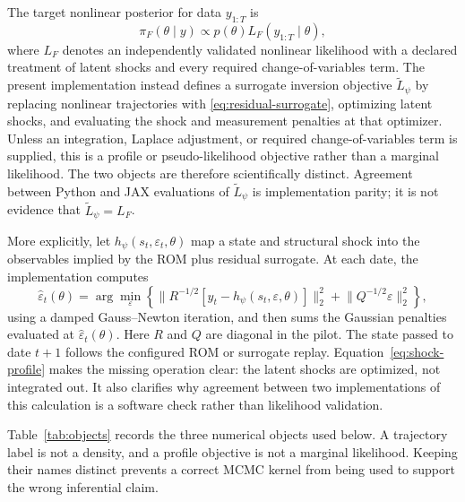 \documentclass[11pt]{article}
\begin{document}
The target nonlinear posterior for data $y_{1:T}$ is
\begin{equation}
  \pi_F(\theta\mid y)\propto p(\theta)L_F(y_{1:T}\mid\theta),
  \label{eq:exact-posterior}
\end{equation}
where $L_F$ denotes an independently validated nonlinear likelihood with a
declared treatment of latent shocks and every required change-of-variables
term. The present implementation instead defines a surrogate inversion objective
$\widetilde L_{\psi}$ by replacing nonlinear trajectories with
\eqref{eq:residual-surrogate}, optimizing latent shocks, and evaluating the
shock and measurement penalties at that optimizer. Unless an integration,
Laplace adjustment, or required change-of-variables term is supplied, this is a
profile or pseudo-likelihood objective rather than a marginal likelihood. The
two objects are therefore scientifically distinct. Agreement between Python and
JAX evaluations of $\widetilde L_{\psi}$ is implementation parity; it is not
evidence that $\widetilde L_{\psi}=L_F$.

More explicitly, let $h_{\psi}(s_t,\varepsilon_t,\theta)$ map a state and
structural shock into the observables implied by the ROM plus residual
surrogate. At each date, the implementation computes
\begin{equation}
  \widehat\varepsilon_t(\theta)
  =\arg\min_{\varepsilon}
  \left\{
  \lVert R^{-1/2}[y_t-h_{\psi}(s_t,\varepsilon,\theta)]\rVert_2^2
  +\lVert Q^{-1/2}\varepsilon\rVert_2^2
  \right\},
  \label{eq:shock-profile}
\end{equation}
using a damped Gauss--Newton iteration, and then sums the Gaussian penalties
evaluated at $\widehat\varepsilon_t(\theta)$. Here $R$ and $Q$ are diagonal in
the pilot. The state passed to date $t+1$ follows the configured ROM or
surrogate replay. Equation~\eqref{eq:shock-profile} makes the missing operation
clear: the latent shocks are optimized, not integrated out. It also clarifies
why agreement between two implementations of this calculation is a software
check rather than likelihood validation.

Table~\ref{tab:objects} records the three numerical objects used below. A
trajectory label is not a density, and a profile objective is not a marginal
likelihood. Keeping their names distinct prevents a correct MCMC kernel from
being used to support the wrong inferential claim.
\end{document}
